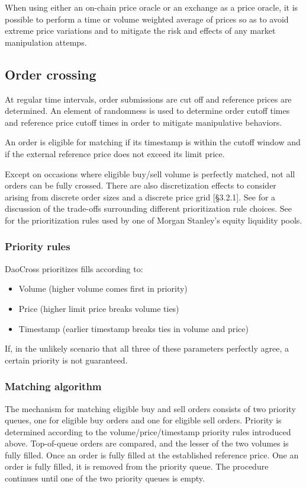 \documentclass[11pt, reqno]{amsart}
\begin{document}
When using either an on-chain price oracle or an exchange as a price oracle,
it is possible to perform a time or volume weighted average of prices so as
to avoid extreme price variations and to mitigate the risk and effects of any
market manipulation attemps.

\subsection{Order crossing}

At regular time intervals, order submissions are cut off and reference prices
are determined. An element of randomness is used to determine order cutoff
times and reference price cutoff times in order to
mitigate manipulative behaviors.

An order is eligible for matching if its timestamp is within the cutoff window
and if the external reference price does not exceed its limit price.

Except on occasions where eligible buy/sell volume is perfectly matched, not
all orders can be fully crossed. There are also discretization effects to
consider arising from discrete order sizes and a discrete price grid
\cite{BoBoDoGo18}[\S 3.2.1].
See \cite{BeLaLiVa22} for a discussion of the trade-offs surrounding
different prioritization rule choices. See \cite{MsAts} for the
prioritization rules used by one of Morgan Stanley's equity liquidity pools.

\subsubsection{Priority rules}
DaoCross prioritizes fills according to:
\begin{itemize}
    \item Volume (higher volume comes first in priority)
    \item Price (higher limit price breaks volume ties)
    \item Timestamp (earlier timestamp breaks ties in volume and price)
\end{itemize}
If, in the unlikely scenario that all three of these parameters perfectly
agree, a certain priority is not guaranteed.

\subsubsection{Matching algorithm}
The mechanism for matching eligible buy and sell orders consists of two
priority queues, one for eligible buy orders and one for eligible sell orders.
Priority is determined according to the volume/price/timestamp priority rules
introduced above. Top-of-queue orders are compared, and the lesser of the two
volumes is fully filled. Once an order is fully filled at the established
reference price. One an order is fully filled, it is removed from the priority
queue. The procedure continues until one of the two priority queues is empty.
\end{document}
